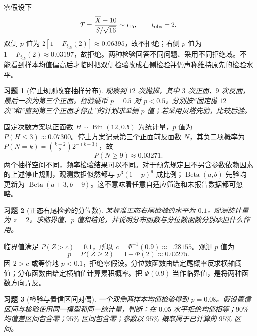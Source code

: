 \documentclass[12pt,fontset=fandol]{ctexart}
\newtheorem{exercise}{习题}[section]
\begin{document}
\begin{solve}\label{a:M-P9-1}零假设下\[T=\frac{\overline X-10}{S/\sqrt{16}}\sim t_{15},\qquad t_{\rm obs}=2.\]双侧 $p$ 值为 $2[1-F_{t_{15}}(2)]\approx0.06395$，故不拒绝；右侧 $p$ 值为 $1-F_{t_{15}}(2)\approx0.03197$，故拒绝。两种检验回答不同问题、采用不同拒绝域。不能看到样本均值偏高后才临时把双侧检验改成右侧检验并仍声称维持原先的检验水平。\end{solve}

\begin{exercise}[停止规则改变抽样分布]\label{q:M-P9-2}
观察到 $12$ 次抛掷，其中 $3$ 次正面、$9$ 次反面，最后一次为第三个正面。检验硬币 $p=0.5$ 对 $p<0.5$。分别按“固定抛 $12$ 次”和“直到第三个正面才停止”的计划求单侧 $p$ 值；若采用贝塔先验，比较后验。\par{}
\end{exercise}

\begin{solve}\label{a:M-P9-2}固定次数方案以正面数 $H\sim\operatorname{Bin}(12,0.5)$ 为统计量，$p$ 值为 $P(H\le3)\approx0.07300$。停止方案记录第三个正面前反面数 $N$，其负二项概率为 $P(N=k)=\binom{k+2}{2}2^{-(k+3)}$，故\[P(N\ge9)\approx0.03271.\]两个抽样空间不同，频率检验结果可以不同。对于预先规定且不另含参数依赖因素的上述停止规则，观测数据似然都与 $p^3(1-p)^9$ 成比例；$\operatorname{Beta}(a,b)$ 先验均更新为 $\operatorname{Beta}(a+3,b+9)$。这不意味着任意自适应筛选和未报告数据都可忽略。\end{solve}

\begin{exercise}[正态右尾检验的分位数]\label{q:M-E2-II4}
某标准正态右尾检验的水平为 $0.1$，观测统计量为 $z=2$。求临界值、$p$ 值和结论，并说明分布函数与分位数函数分别承担什么作用。\par{}
\end{exercise}

\begin{solve}\label{a:M-E2-II4}临界值满足 $P(Z>c)=0.1$，所以 $c=\Phi^{-1}(0.9)\approx1.28155$。观测 $p$ 值为\[p=P(Z\ge2)=1-\Phi(2)\approx0.02275.\]因 $2>c$ 或等价地 $p<0.1$，拒绝零假设。分位数函数由给定尾概率反求横轴阈值；分布函数由给定横轴值计算累积概率。把 $\Phi(0.9)$ 当作临界值，是将两种函数方向弄反。\end{solve}

\begin{exercise}[检验与置信区间对偶]\label{q:M-F-C10}
一个双侧两样本均值检验得到 $p=0.08$。假设置信区间与检验使用同一模型和同一统计量，判断：在 $0.05$ 水平拒绝均值相等；$90\%$ 均值差区间包含零；$95\%$ 区间包含零；参数以 $95\%$ 概率属于已计算的 $95\%$ 区间。\par{}
\end{exercise}
\end{document}
